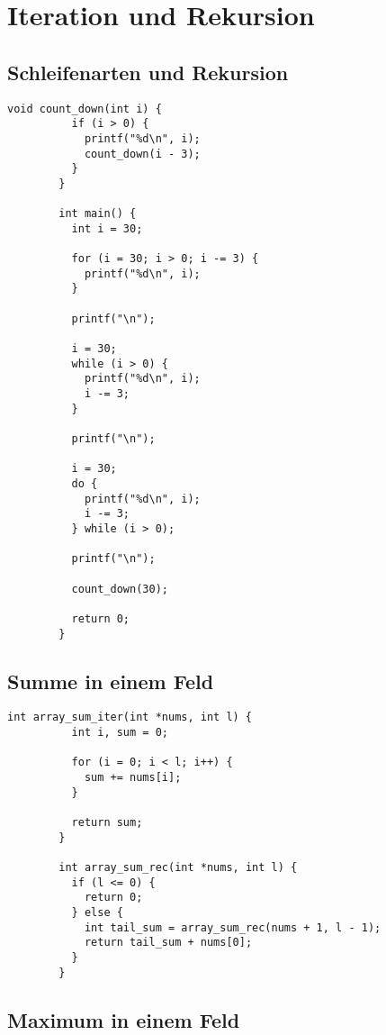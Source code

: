 \documentclass[]{article}
\begin{document}
	\section{Iteration und Rekursion}
	
	\subsection{Schleifenarten und Rekursion}
	
	\begin{lstlisting}[gobble=4]
		void count_down(int i) {
		  if (i > 0) {
		    printf("%d\n", i);
		    count_down(i - 3);
		  }
		}
		
		int main() {
		  int i = 30;
		  
		  for (i = 30; i > 0; i -= 3) {
		    printf("%d\n", i);
		  } 
		  
		  printf("\n");
		  
		  i = 30;
		  while (i > 0) {
		    printf("%d\n", i);
		    i -= 3;
		  }  
		  
		  printf("\n");
		 
		  i = 30;
		  do {
		    printf("%d\n", i);
		    i -= 3;
		  } while (i > 0);
		  
		  printf("\n");
		  
		  count_down(30);
		  
		  return 0;
		}
	\end{lstlisting}
	
	\clearpage
	
	\subsection{Summe in einem Feld}
	
	\begin{lstlisting}[gobble=4]
		int array_sum_iter(int *nums, int l) {
		  int i, sum = 0;
		  
		  for (i = 0; i < l; i++) {
		    sum += nums[i];
		  }
		  
		  return sum;
		}
		
		int array_sum_rec(int *nums, int l) {
		  if (l <= 0) {
		    return 0;
		  } else {
		    int tail_sum = array_sum_rec(nums + 1, l - 1);
		    return tail_sum + nums[0];
		  }
		}
	\end{lstlisting}

	\subsection{Maximum in einem Feld}
\end{document}
